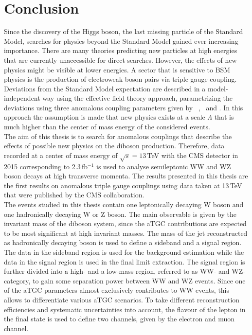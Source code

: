 \chapter{Conclusion}
\label{ch:Conclusion}
Since the discovery of the Higgs boson, the last missing particle of the Standard Model, searches for physics beyond the Standard Model gained ever increasing importance. There are many theories predicting new particles at high energies that are currently unaccessible for direct searches. However, the effects of new physics might be visible at lower energies. A sector that is sensitive to BSM physics is the production of electroweak boson pairs via triple gauge coupling. Deviations from the Standard Model expectation are described in a model-independent way using the effective field theory approach, parametrizing the deviations using three anomalous coupling parameters given by \Tcwww ~, \Tccw \ and \Tcb . In this approach the assumption is made that new physics exists at a scale $\Lambda$ that is much higher than the center of mass energy of the considered events.\\

The aim of this thesis is to search for anomalous couplings that describe the effects of possible new physics on the diboson production. Therefore, data recorded at a center of mass energy of $\sqrt{s}=13$\,TeV with the CMS detector in 2015 corresponding to 2.3\,fb$^{-1}$ is used to analyse semileptonic WW and WZ boson decays at high transverse momenta. The results presented in this thesis are the first results on anomalous triple gauge couplings using data taken at 13\,TeV that were published by the CMS collaboration.\\

The events studied in this thesis contain one leptonically decaying W boson and one hadronically decaying W or Z boson. The main observable is given by the invariant mass of the diboson system, since the aTGC contributions are expected to be most significant at high invariant masses. The mass of the jet reconstructed as hadronically decaying boson is used to define a sideband and a signal region. The data in the sideband region is used for the background estimation while the data in the signal region is used in the final limit extraction. The signal region is further divided into a high- and a low-mass region, referred to as WW- and WZ-category, to gain some separation power between WW and WZ events. Since one of the aTGC parameters almost exclusively contributes to WW events, this allows to differentiate various aTGC scenarios. To take different reconstruction efficiencies and systematic uncertainties into account, the flavour of the lepton in the final state is used to define two channels, given by the electron and muon channel.\\

